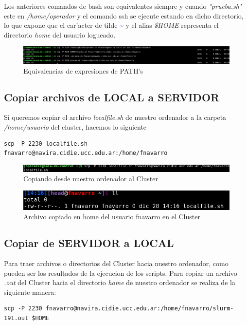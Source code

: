 \documentclass[a4paper]{scrartcl}
\newcommand{\BashFancyFormatLine}{%
  \def\FancyVerbFormatLine##1{\$\,##1}%
}
\begin{document}
Los anteriores comandos de bash son equivalentes siempre y cuando \textit{"prueba.sh"} este en \textit{/home/operador} y el comando ssh se ejecute estando en dicho directorio, lo que expone que el car'acter de tilde \textcolor{blue}{\textasciitilde} y el alias \textit{\$HOME} representa el directorio \textit{home} del usuario logueado.

\begin{figure}[ht]
	\includegraphics[width=\columnwidth]{./ssh_scp_sftp_imgs/samescp}
	\caption{Equivalencias de expresiones de PATH's}
	\label{fig:samescp}
\end{figure}

\subsection{Copiar archivos de LOCAL a SERVIDOR}
Si queremos copiar el archivo \textit{localfile.sh} de nuestro ordenador a la carpeta \textit{/home/usuario} del cluster, hacemos lo siguiente
\begin{verbatim}
scp -P 2230 localfile.sh fnavarro@navira.cidie.ucc.edu.ar:/home/fnavarro
\end{verbatim}

\begin{figure}[ht]
	\includegraphics[width=\columnwidth]{./ssh_scp_sftp_imgs/LtoS}
	\caption{Copiando desde nuestro ordenador al Cluster}
	\label{fig:LtoS}
\end{figure}

\begin{figure}[ht]
	\includegraphics[scale=0.5]{./ssh_scp_sftp_imgs/LtoS_A}
	\caption{Archivo copiado en home del usuario fnavarro en el Cluster}
	\label{fig:LtoS_A}
\end{figure}

\subsection{Copiar de SERVIDOR a LOCAL}
Para traer archivos o directorios del Cluster hacia nuestro ordenador, como pueden ser los resultados de la ejecucion de los scripts. 
Para copiar un archivo \textit{.out} del Cluster hacia el directorio \textit{home} de nuestro ordenador se realiza de la siguiente manera:
\begin{verbatim}
scp -P 2230 fnavarro@navira.cidie.ucc.edu.ar:/home/fnavarro/slurm-191.out $HOME
\end{verbatim}
\end{document}
